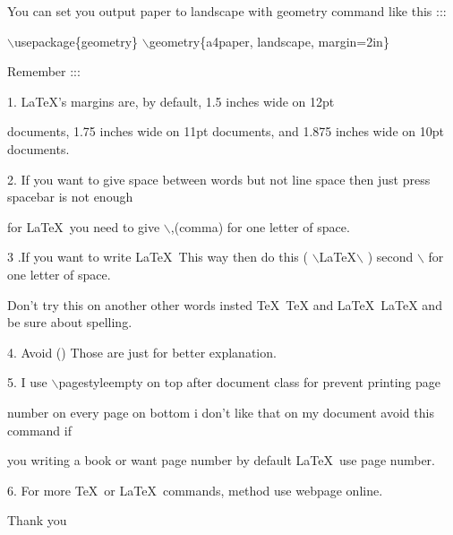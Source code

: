 \documentclass[12pt]{article}
\begin{document}
You can set you output paper to landscape with geometry command like this :::

$\backslash$usepackage\{geometry\}
$\backslash$geometry\{a4paper, landscape, margin=2in\}

\vspace{0.5cm}

Remember :::

\vspace{0.5cm}

1. LaTeX's margins are, by default, 1.5 inches wide on 12pt 

documents, 1.75 inches wide on 11pt documents,
and 1.875 inches wide on 10pt documents.
 
 
2. If you want to give space between words but not line space then just press spacebar is not enough

for \LaTeX\ you need to give $\backslash$,(comma) for one letter of space.


3 .If you want to write \LaTeX\ This way then do this ( $\backslash$LaTeX$\backslash$ ) second $\backslash$ for one letter of space.

 Don't try this on another other words insted \TeX\ TeX and \LaTeX\ LaTeX and be sure about spelling.

4. Avoid () Those are just for better explanation.

5. I use $\backslash$pagestyle{empty} on top after document class for prevent printing page

number on every page on bottom i don't like that on my document avoid this command if

you writing a book or want page number by default \LaTeX\ use page number.

6. For more \TeX\ or \LaTeX\ commands, method use webpage online.


\begin{center}
\Huge Thank you
\end{center}
\end{document}
